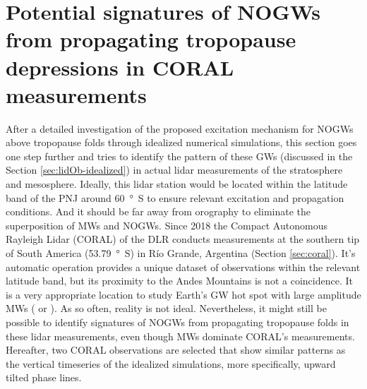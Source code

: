 \section{Potential signatures of NOGWs from propagating tropopause depressions in CORAL measurements}
\label{sec:lidOb-coral}
%
After a detailed investigation of the proposed excitation mechanism for NOGWs above tropopause folds through idealized numerical simulations, this section goes one step further and tries to identify the pattern of these GWs (discussed in the Section \ref{sec:lidOb-idealized}) in actual lidar measurements of the stratosphere and mesosphere. Ideally, this lidar station would be located within the latitude band of the PNJ around \SI{60}{\degree S} to ensure relevant excitation and propagation conditions. And it should be far away from orography to eliminate the superposition of MWs and NOGWs. Since 2018 the Compact Autonomous Rayleigh Lidar (CORAL) of the DLR conducts measurements at the southern tip of South America (\SI{53.79}{\degree S}) in Río Grande, Argentina (Section \ref{sec:coral}). It's automatic operation provides a unique dataset of observations within the relevant latitude band, but its proximity to the Andes Mountains is not a coincidence. It is a very appropriate location to study Earth's GW hot spot with large amplitude MWs (\cite[]{rapp_southtrac-gw_2021} or \cite[]{reichert_highcadence_2021}). As so often, reality is not ideal. Nevertheless, it might still be possible to identify signatures of NOGWs from propagating tropopause folds in these lidar measurements, even though MWs dominate CORAL's measurements. Hereafter, two CORAL observations are selected that show similar patterns as the vertical timeseries of the idealized simulations, more specifically, upward tilted phase lines. 

